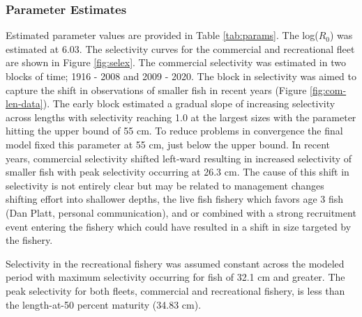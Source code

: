\documentclass[11pt,
  english,
  a4paper,
]{article}
\begin{document}
\leavevmode\tagmcend\tagstructend\par


\hypertarget{parameter-estimates}{%
\subsubsection{Parameter Estimates}\label{parameter-estimates}}

\leavevmode\tagmcend\tagstructend


Estimated parameter values are provided in Table \ref{tab:params}. The log({\(R_0\)\leavevmode\tagmcend\tagstructend}) was estimated at 6.03. The selectivity curves for the commercial and recreational fleet are shown in Figure \ref{fig:selex}. The commercial selectivity was estimated in two blocks of time; 1916 - 2008 and 2009 - 2020. The block in selectivity was aimed to capture the shift in observations of smaller fish in recent years (Figure \ref{fig:com-len-data}). The early block estimated a gradual slope of increasing selectivity across lengths with selectivity reaching 1.0 at the largest sizes with the parameter hitting the upper bound of 55 cm. To reduce problems in convergence the final model fixed this parameter at 55 cm, just below the upper bound. In recent years, commercial selectivity shifted left-ward resulting in increased selectivity of smaller fish with peak selectivity occurring at 26.3 cm. The cause of this shift in selectivity is not entirely clear but may be related to management changes shifting effort into shallower depths, the live fish fishery which favors age 3 fish (Dan Platt, personal communication), and or combined with a strong recruitment event entering the fishery which could have resulted in a shift in size targeted by the fishery.

\leavevmode\tagmcend\tagstructend\par


Selectivity in the recreational fishery was assumed constant across the modeled period with maximum selectivity occurring for fish of 32.1 cm and greater. The peak selectivity for both fleets, commercial and recreational fishery, is less than the length-at-50 percent maturity (34.83 cm).

\leavevmode\tagmcend\tagstructend\par
\end{document}
